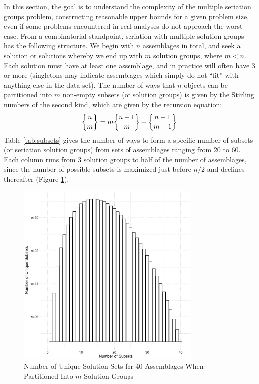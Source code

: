 \documentclass[preprint,times,authoryear,12pt]{els-workingpaper}
\newenvironment{knitrout}{}{} %
\newcommand{\stirlingsubset}[2]{\ensuremath{\genfrac{\lbrace}{\rbrace}{0pt}{}{#1}{#2}}}
\begin{document}
In this section, the goal is to understand the complexity of the multiple seriation groups problem, constructing reasonable upper bounds for a given problem size, even if some problems encountered in real analyses do not approach the worst case.  From a combinatorial standpoint, seriation with multiple solution groups has the following structure.  
We begin with $n$ assemblages in total, and seek a solution or solutions whereby we end up with $m$ solution groups, where $m < n$.  Each solution must have at least one assemblage, and in practice will often have 3 or more (singletons may indicate assemblages which simply do not ``fit'' with anything else in the data set).  The number of ways that $n$ objects can be partitioned into $m$ non-empty subsets (or solution groups) is given by the Stirling numbers of the second kind, which are given by the recursion equation:
\begin{equation}
\stirlingsubset{n}{m} = m \stirlingsubset{n-1}{m} + \stirlingsubset{n-1}{m-1}
\end{equation}
Table \ref{tab:subsets} gives the number of ways to form a specific number of subsets (or seriation solution groups) from sets of assemblages ranging from 20 to 60.  Each column runs from 3 solution groups to half of the number of assemblages, since the number of possible subsets is maximized just before $n/2$ and declines thereafter (Figure \ref{fig:subsets-graph}).  

\begin{knitrout}
\color{fgcolor}\begin{figure}[h!]
\includegraphics[width=3.5in]{subsets-graph-1} \caption[Number of Unique Solution Sets for 40 Assemblages When Partitioned Into ]{Number of Unique Solution Sets for 40 Assemblages When Partitioned Into $m$ Solution Groups\label{fig:subsets-graph}}
\end{figure}


\end{knitrout}
\end{document}
